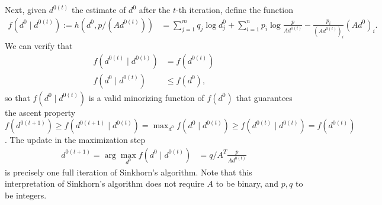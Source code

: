 Next, given $d^{0(t)}$ the estimate of $d^{0}$ after the
$t$-th iteration, define the function 
\begin{align*}
f(d^{0}\mid d^{0(t)}):=h(d^{0},p/(Ad^{0(t)})) & =\sum_{j=1}^{m}q_{j}\log d_{j}^{0}+\sum_{i=1}^{n}p_{i}\log\frac{p}{Ad^{0(t)}}-\frac{p_{i}}{(Ad^{0(t)})_{i}}(Ad^{0})_{i}.
\end{align*}
We can verify that 
\begin{align*}
f(d^{0(t)}\mid d^{0(t)}) & =f(d^{0(t)})\\
f(d^{0}\mid d^{0(t)}) & \leq f(d^{0}),
\end{align*}
 so that $f(d^{0}\mid d^{0(t)})$ is a valid minorizing function of
$f(d^{0})$ \citep{lange2000optimization} that guarantees the ascent property $f(d^{0(t+1)})\geq f(d^{0(t+1)}\mid d^{0(t)})=\max_{d^{0}}f(d^{0}\mid d^{0(t)})\geq f(d^{0(t)}\mid d^{0(t)})=f(d^{0(t)})$.
The update in the maximization step
\begin{align*}
d^{0(t+1)}=\arg\max_{d^{0}}f(d^{0}\mid d^{0(t)}) & =q/A^{T}\frac{p}{Ad^{0(t)}}
\end{align*}
 is precisely one full iteration of Sinkhorn's algorithm. Note that this interpretation of Sinkhorn's algorithm does not require $A$ to be binary, and $p,q$ to be integers.

